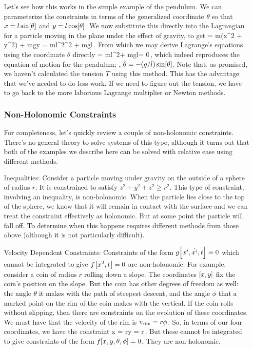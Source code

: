 Let's see how this works in the simple example of the pendulum. We can parameterize the constraints in terms of the generalized coordinate $\theta$ so that $x = l\sin\!\left[{\theta}\right]$ and $y = l\cos\!\left[{\theta}\right]$. We now substitute this directly into the Lagrangian for a particle moving in the plane under the effect of gravity, to get
\beq
\lag = m\left(\dt x^2 + \dt y^2\right) + mgy = ml^2\dt\theta^2 + mgl\cos\vat\theta\,.
\eeq
From which we may derive Lagrange's equations using the coordinate $\theta$ directly
\beq
\eleqn{\theta}{} = ml^2\ddt\theta + mgl\sin\vat\theta = 0\,,
\eeq
which indeed reproduces the equation of motion for the pendulum; \viz, $\ddot{\theta} = -(g/l)\sin\!\left[{\theta}\right]$. Note that, as promised, we haven't calculated the tension $T$ using this method. This has the advantage that we've needed to do less work. If we need to figure out the tension, we have to go back to the more laborious Lagrange multiplier or Newton methods.

\subsubsection{Non-Holonomic Constraints} 
For completeness, let's quickly review a couple of non-holonomic constraints. There's no general theory to solve systems of this type, although it turns out that both of the examples we describe here can be solved with relative ease using different methods.

Inequalities: Consider a particle moving under gravity on the outside of a sphere of radius $r$. It is constrained to satisfy $z^2 + y^2 + z^2 \geq r^2$. This type of constraint, involving an inequality, is non-holonomic. When the particle lies close to the top of the sphere, we know that it will remain in contact with the surface and we can treat the constraint effectively as holonomic. But at some point the particle will fall off. To determine when this happens requires different methods from those above (although it is not particularly difficult).

Velocity Dependent Constraints: Constraints of the form $g\!\left[{x^i, \dot{x^i}, t}\right] = 0$ which cannot be integrated to give $f\!\left[{x^2,t}\right] = 0$ are non-holonomic. For example, consider a coin of radius $r$ rolling down a slope. The coordinates $\left[{x,y}\right]$ fix the coin's position on the slope. But the coin has other degrees of freedom as well: the angle $\theta$ it makes with the path of steepest descent, and the angle $\phi$ that a marked point on the rim of the coin makes with the vertical. If the coin rolls without slipping, then there are constraints on the evolution of these coordinates. We must have that the velocity of the rim is $v_\text{rim} = r\phi$. So, in terms of our four coordinates, we have the constraint
\beq
x = r\dt\phi\sin\vat\theta\qquad{}\qquad y = r\dt\phi\cos\vat\theta\,. 
\eeq
But these cannot be integrated to give constraints of the form $f\!\left[{x,y,\theta,\phi}\right] = 0$. They are non-holonomic.

